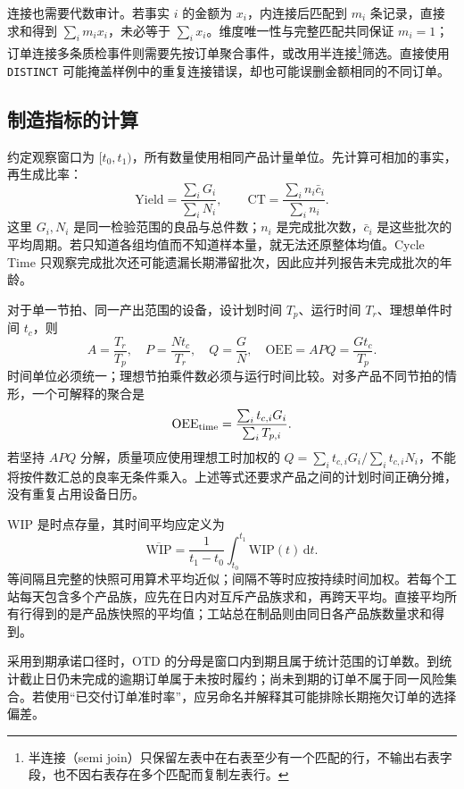 连接也需要代数审计。若事实 \(i\) 的金额为 \(x_i\)，内连接后匹配到 \(m_i\) 条记录，直接求和得到 \(\sum_i m_ix_i\)，未必等于 \(\sum_i x_i\)。维度唯一性与完整匹配共同保证 \(m_i=1\)；订单连接多条质检事件则需要先按订单聚合事件，或改用半连接\footnote{半连接（semi join）只保留左表中在右表至少有一个匹配的行，不输出右表字段，也不因右表存在多个匹配而复制左表行。}筛选。直接使用 \texttt{DISTINCT} 可能掩盖样例中的重复连接错误，却也可能误删金额相同的不同订单。

\subsection{制造指标的计算}
约定观察窗口为 \([t_0,t_1)\)，所有数量使用相同产品计量单位。先计算可相加的事实，再生成比率：
\[
\mathrm{Yield}=\frac{\sum_i G_i}{\sum_i N_i},\qquad
\mathrm{CT}=\frac{\sum_i n_i\bar c_i}{\sum_i n_i}.
\]
这里 \(G_i,N_i\) 是同一检验范围的良品与总件数；\(n_i\) 是完成批次数，\(\bar c_i\) 是这些批次的平均周期。若只知道各组均值而不知道样本量，就无法还原整体均值。Cycle Time 只观察完成批次还可能遗漏长期滞留批次，因此应并列报告未完成批次的年龄。

对于单一节拍、同一产出范围的设备，设计划时间 \(T_p\)、运行时间 \(T_r\)、理想单件时间 \(t_c\)，则
\[
A=\frac{T_r}{T_p},\quad
P=\frac{Nt_c}{T_r},\quad
Q=\frac GN,\quad
\mathrm{OEE}=APQ=\frac{Gt_c}{T_p}.
\]
时间单位必须统一；理想节拍乘件数必须与运行时间比较。对多产品不同节拍的情形，一个可解释的聚合是
\[
\mathrm{OEE}_{\rm time}=\frac{\sum_i t_{c,i}G_i}{\sum_i T_{p,i}}.
\]
若坚持 \(A P Q\) 分解，质量项应使用理想工时加权的 \(Q=\sum_i t_{c,i}G_i/\sum_i t_{c,i}N_i\)，不能将按件数汇总的良率无条件乘入。上述等式还要求产品之间的计划时间正确分摊，没有重复占用设备日历\cite{semi03}。

WIP 是时点存量，其时间平均应定义为
\[
\overline{\mathrm{WIP}}
=\frac1{t_1-t_0}\int_{t_0}^{t_1}\mathrm{WIP}(t)\,\mathrm dt.
\]
等间隔且完整的快照可用算术平均近似；间隔不等时应按持续时间加权。若每个工站每天包含多个产品族，应先在日内对互斥产品族求和，再跨天平均。直接平均所有行得到的是产品族快照的平均值；工站总在制品则由同日各产品族数量求和得到。

采用到期承诺口径时，OTD 的分母是窗口内到期且属于统计范围的订单数。到统计截止日仍未完成的逾期订单属于未按时履约；尚未到期的订单不属于同一风险集合。若使用“已交付订单准时率”，应另命名并解释其可能排除长期拖欠订单的选择偏差。

